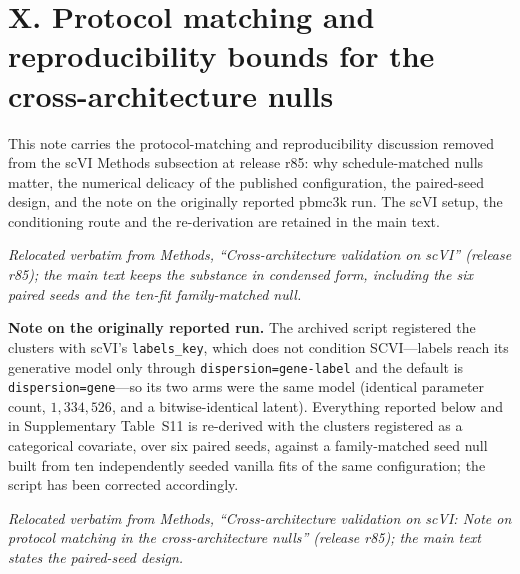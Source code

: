 \documentclass[11 pt,a4 paper]{article}
\begin{document}
\section*{X. Protocol matching and reproducibility bounds for the cross-architecture nulls}

This note carries the protocol-matching and reproducibility discussion removed from the scVI Methods subsection at release r85: why schedule-matched nulls matter, the numerical delicacy of the published configuration, the paired-seed design, and the note on the originally reported pbmc3k run. The scVI setup, the conditioning route and the re-derivation are retained in the main text.

\noindent\emph{Relocated verbatim from Methods, ``Cross-architecture validation on scVI'' (release r85); the main text keeps the substance in condensed form, including the six paired seeds and the ten-fit family-matched null.}

\textbf{Note on the originally reported run.} The archived script registered the clusters with scVI's \texttt{labels\_key}, which does not condition SCVI---labels reach its generative model only through \texttt{dispersion=gene-label} and the default is \texttt{dispersion=gene}---so its two arms were the same model (identical parameter count, $1{,}334{,}526$, and a bitwise-identical latent). Everything reported below and in Supplementary Table~S11 is re-derived with the clusters registered as a categorical covariate, over six paired seeds, against a family-matched seed null built from ten independently seeded vanilla fits of the same configuration; the script has been corrected accordingly.

\noindent\emph{Relocated verbatim from Methods, ``Cross-architecture validation on scVI: Note on protocol matching in the cross-architecture nulls'' (release r85); the main text states the paired-seed design.}
\end{document}
